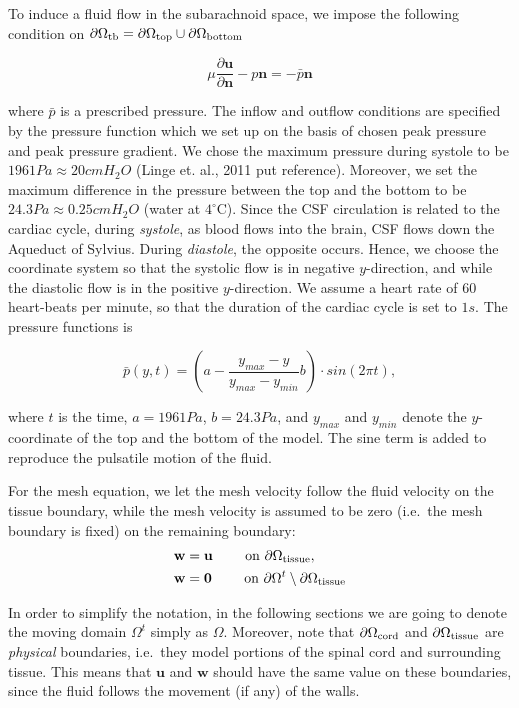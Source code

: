 \documentclass[11pt,a4paper,titlepage]{report}
\begin{document}
To induce a fluid flow in the subarachnoid space, we impose the following condition on $\partial \Omega_{\rm tb} = \partial \Omega_{\rm top} \cup \partial \Omega_{\rm bottom}$ 

\begin{equation}
\label{eq:bc:6}
\mu \frac{\partial \mathbf{u}}{\partial \mathbf{n}} - p \mathbf{n} = -\bar{p} \mathbf{n}
\end{equation}

where $\bar{p}$ is a prescribed pressure. The inflow and outflow conditions are specified by the pressure function which we set up on the basis of chosen peak pressure and peak pressure gradient. We chose the maximum pressure during systole to be $1961Pa \approx 20 cmH_2O$ (Linge et. al., 2011 put reference). Moreover, we set the maximum difference in the pressure between the top and the bottom to be $24.3 Pa \approx 0.25 cmH_2O$ (water at $4^{\circ}$C). Since the CSF circulation is related to the cardiac cycle, during \textit{systole}, as blood flows into the brain, CSF flows down the Aqueduct of Sylvius. During \textit{diastole}, the opposite occurs. Hence, we choose the coordinate system so that the systolic flow is in negative $y$-direction, and while the diastolic flow is in the positive $y$-direction. We assume a heart rate of $60$ heart-beats per minute, so that the duration of the cardiac cycle is set to $1s$. The pressure functions is 

\begin{equation}
\bar{p}(y,t) = (a - \frac{y_{max} - y}{y_{max} - y_{min}}b) \cdot sin(2\pi t),
\end{equation}

where $t$ is the time, $a = 1961 Pa$, $b = 24.3 Pa$, and $y_{max}$ and $y_{min}$ denote the $y$-coordinate of the top and the bottom of the model. The sine term is added to reproduce the pulsatile motion of the fluid.

For the mesh equation, we let the mesh velocity follow the fluid
velocity on the tissue boundary, while the mesh velocity is assumed to
be zero (i.e.~the mesh boundary is fixed) on the remaining boundary:
\begin{align}
\label{eq:bc:5}
\mathbf{w} &= \mathbf{u}  \qquad \text{ on } \partial \Omega_{\rm tissue},\\
\mathbf{w} &= \mathbf{0}  \qquad \text{ on } \partial \Omega^t \setminus \partial \Omega_{\rm tissue}
\end{align}

In order to simplify the notation, in the following sections we are going to denote the moving domain $\Omega^t$ simply as $\Omega$. Moreover, note that $\partial \Omega_{\rm cord}$ and $\partial \Omega_{\rm
  tissue}$ are \textit{physical} boundaries, i.e.~they model portions
of the spinal cord and surrounding tissue. This means that
$\mathbf{u}$ and $\mathbf{w}$ should have the same value on these
boundaries, since the fluid follows the movement (if any) of the
walls.
\end{document}
